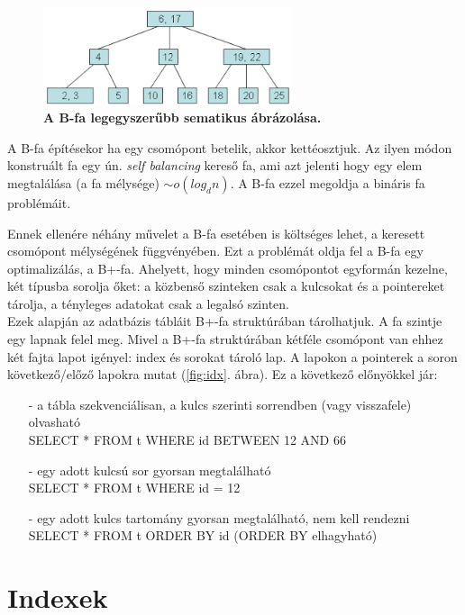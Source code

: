 \documentclass[12pt]{article}
\theoremstyle{plain}
\begin{document}
\begin{figure}[H]
    \begin{center}
    \includegraphics[width=0.65\textwidth]{media/btree.png}
    \caption{\textbf{A B-fa legegyszerűbb sematikus ábrázolása.}} 
    \label{fig:tree}
    \end{center}
\end{figure}

A B-fa építésekor ha egy csomópont betelik, akkor kettéosztjuk. Az ilyen módon konstruált fa egy ún. \textit{self balancing} kereső fa, ami azt jelenti hogy egy elem megtalálása (a fa mélysége) $\sim o(log_dn)$. A B-fa ezzel megoldja a bináris fa problémáit.
\par
Ennek ellenére néhány művelet a B-fa esetében is költséges lehet, a keresett csomópont mélységének függvényében. Ezt a problémát oldja fel a B-fa egy optimalizálás, a B+-fa. Ahelyett, hogy minden csomópontot egyformán kezelne, két típusba sorolja őket: a közbenső szinteken csak a kulcsokat és a pointereket tárolja, a tényleges adatokat csak a legalsó szinten. 
\\
Ezek alapján az adatbázis tábláit B+-fa struktúrában tárolhatjuk. A fa szintje egy lapnak felel meg. Mivel a B+-fa struktúrában kétféle csomópont van ehhez két fajta lapot igényel: index és sorokat tároló lap. A lapokon a pointerek a soron következő/előző lapokra mutat (\ref{fig:idx}. ábra). Ez a következő előnyökkel jár: 
\begin{itemize}
    \item[-] a tábla szekvenciálisan, a kulcs szerinti sorrendben (vagy visszafele) olvasható \\
    SELECT * FROM t WHERE id BETWEEN 12 AND 66
    \item[-] egy adott kulcsú sor gyorsan megtalálható \\SELECT * FROM t WHERE id = 12
    \item[-] egy adott kulcs tartomány gyorsan megtalálható, nem kell rendezni \\
    SELECT * FROM t ORDER BY id (ORDER BY elhagyható)
\end{itemize}{}

\section{Indexek}
\end{document}
